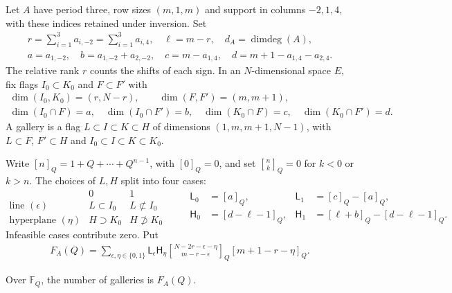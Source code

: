 \documentclass[a4paper,11pt]{amsart}
\numberwithin{equation}{subsection}
\theoremstyle{plain}
\theoremstyle{definition}
\theoremstyle{remark}
\newcommand{\qbinom}[2]{\genfrac{[}{]}{0pt}{}{#1}{#2}}
\begin{document}
\begin{definition}\label{def:gallery-flags}
Let $A$ have period three, row sizes $(m,1,m)$ and support in columns $-2,1,4$,
with these indices retained under inversion. Set
\[
\begin{gathered}
r=\sum_{i=1}^3 a_{i,-2}=\sum_{i=1}^3 a_{i,4},\quad \ell=m-r,
\quad d_A=\operatorname{dimdeg}(A),\\
a=a_{1,-2},\quad b=a_{1,-2}+a_{2,-2},\quad
c=m-a_{1,4},\quad d=m+1-a_{1,4}-a_{2,4}.
\end{gathered}
\]
The relative rank $r$ counts the shifts of each sign.
In an $N$-dimensional space $E$, fix flags $I_0\subset K_0$
and $F\subset F'$ with
\[
\begin{gathered}
\dim(I_0,K_0)=(r,N-r),\qquad\dim(F,F')=(m,m+1),\\
\dim(I_0\cap F)=a,\quad\dim(I_0\cap F')=b,\quad
\dim(K_0\cap F)=c,\quad\dim(K_0\cap F')=d.
\end{gathered}
\]
A gallery is a flag $L\subset I\subset K\subset H$ of
dimensions $(1,m,m+1,N-1)$, with $L\subset F$, $F'\subset H$
and $I_0\subset I\subset K\subset K_0$.
\end{definition}

Write $[n]_Q=1+Q+\cdots+Q^{n-1}$, with $[0]_Q=0$, and set
$\qbinom{n}{k}_Q=0$ for $k<0$ or $k>n$.
The choices of $L,H$ split into four cases:
\[
\begin{array}{c|cc}
&0&1\\\hline
\text{line }(\epsilon)&L\subset I_0&L\not\subset I_0\\
\text{hyperplane }(\eta)&H\supset K_0&H\not\supset K_0
\end{array}
\qquad
\begin{aligned}
\mathsf L_0&=[a]_Q,&\mathsf L_1&=[c]_Q-[a]_Q,\\
\mathsf H_0&=[d-\ell-1]_Q,&
\mathsf H_1&=[\ell+b]_Q-[d-\ell-1]_Q.
\end{aligned}
\]
Infeasible cases contribute zero. Put
\begin{gather}\label{eq:gallery-Gaussian}
F_A(Q)=\sum_{\epsilon,\eta\in\{0,1\}}
\mathsf L_\epsilon\mathsf H_\eta
\qbinom{N-2r-\epsilon-\eta}{m-r-\epsilon}_Q
[m+1-r-\eta]_Q.
\end{gather}

\begin{lemma}\label{lem:finite-flag-count}
Over $\mathbb F_Q$, the number of galleries is $F_A(Q)$.
\end{lemma}
\end{document}
